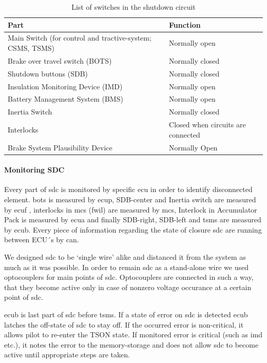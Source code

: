 \begin{table}[H]
	\caption{List of switches in the shutdown circuit}
	\centering
	\begin{tabu}{|X|l|}
		\hline Part  & Function \\
		\hline Main Switch (for control and tractive-system; CSMS, TSMS) & Normally open \\
		\hline Brake over travel switch (BOTS) & Normally closed \\
		\hline Shutdown buttons (SDB) & Normally closed \\
		\hline Insulation Monitoring Device (IMD) & Normally open \\
		\hline Battery Management System (BMS) & Normally open \\
		\hline Inertia Switch & Normally closed \\
		\hline Interlocks & Closed when circuits are connected \\
		\hline Brake System Plausibility Device & Normally Open \\
		\hline
	\end{tabu}%
	\label{tab:SDCswitch}%
\end{table}%

\paragraph{Monitoring SDC}
Every part of \gls{sdc} is monitored by specific \gls{ecu} in order to identify disconnected element. \gls{bots} is measured by \gls{ecup}, SDB-center  and Inertia switch are measured by \gls{ecuf} , interlocks in \glspl{mc} (\gls{fwil}) are measured by \glspl{mc}, Interlock in Accumulator Pack is measured by \gls{ecua}  and finally SDB-right, SDB-left and \gls{tsms} are measured by \gls{ecub}. Every piece of information regarding the state of closure \gls{sdc} are running between ECU´s by \gls{can}. 

We designed \gls{sdc} to be ‘single wire’ alike and distanced it from the system as much as it was possible. In order to remain \gls{sdc} as a stand-alone wire we used optocouplers for main points of \gls{sdc}. Optocouplers are connected in such a way, that they become active only in case of nonzero voltage occurance at a certain point of \gls{sdc}.

\Gls{ecub} is last part of \gls{sdc} before \gls{tsms}. If a state of error on \gls{sdc} is detected \gls{ecub} latches the off-state of \gls{sdc} to stay off. If the occurred error is non-critical, it allows pilot to re-enter the TSON state. If monitored error is critical (such as \gls{imd} etc.), it notes the error to the memory-storage and does not allow \gls{sdc} to become active until appropriate steps are taken.

